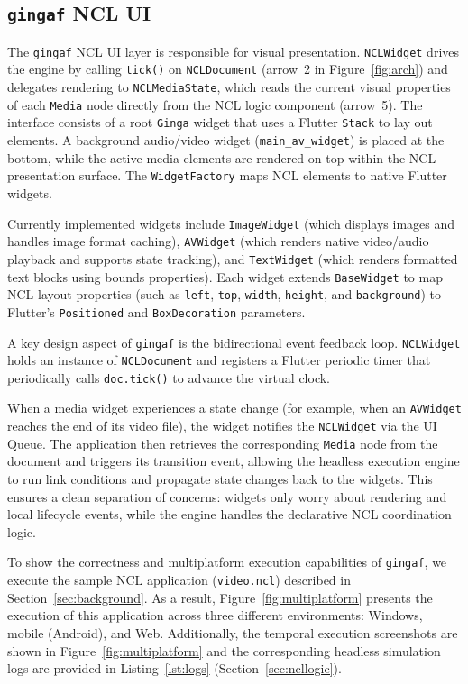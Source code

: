 \documentclass[sigconf,authorversion,review,authordraft]{webmedia}
\newcommand{\projectname}{\texttt{gingaf}}
\begin{document}
\subsection{\projectname{} NCL UI}
\label{sec:nclui2}

The \projectname{} NCL UI layer is responsible for visual presentation. \texttt{NCLWidget} drives the engine by calling \texttt{tick()} on \texttt{NCLDocument} (arrow~2 in Figure~\ref{fig:arch}) and delegates rendering to \texttt{NCLMediaState}, which reads the current visual properties of each \texttt{Media} node directly from the NCL logic component (arrow~5). The interface consists of a root \texttt{Ginga} widget that uses a Flutter \texttt{Stack} to lay out elements. A background audio/video widget (\texttt{main\_av\_widget}) is placed at the bottom, while the active media elements are rendered on top within the NCL presentation surface. The \texttt{WidgetFactory} maps NCL elements to native Flutter widgets.

Currently implemented widgets include \texttt{ImageWidget} (which displays images and handles image format caching), \texttt{AVWidget} (which renders native video/audio playback and supports state tracking), and \texttt{TextWidget} (which renders formatted text blocks using bounds properties). Each widget extends \texttt{BaseWidget} to map NCL layout properties (such as \texttt{left}, \texttt{top}, \texttt{width}, \texttt{height}, and \texttt{background}) to Flutter's \texttt{Positioned} and \texttt{BoxDecoration} parameters.

A key design aspect of \projectname{} is the bidirectional event feedback loop. \texttt{NCLWidget} holds an instance of \texttt{NCLDocument} and registers a Flutter periodic timer that periodically calls \texttt{doc.tick()} to advance the virtual clock.

When a media widget experiences a state change (for example, when an \texttt{AVWidget} reaches the end of its video file), the widget notifies the \texttt{NCLWidget} via the UI Queue. The application then retrieves the corresponding \texttt{Media} node from the document and triggers its transition event, allowing the headless execution engine to run link conditions and propagate state changes back to the widgets. This ensures a clean separation of concerns: widgets only worry about rendering and local lifecycle events, while the engine handles the declarative NCL coordination logic.

To show the correctness and multiplatform execution capabilities of \projectname{}, we execute the sample NCL application (\texttt{video.ncl}) described in Section~\ref{sec:background}. As a result, Figure~\ref{fig:multiplatform} presents the execution of this application across three different environments: Windows, mobile (Android), and Web. Additionally, the temporal execution screenshots are shown in Figure~\ref{fig:multiplatform} and the corresponding headless simulation logs are provided in Listing~\ref{lst:logs} (Section~\ref{sec:ncllogic}).
\end{document}
